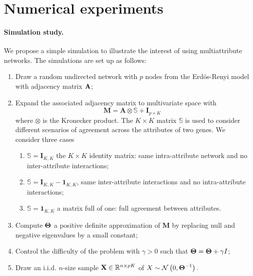 \section{Numerical  experiments}

\paragraph*{Simulation study.} We propose a simple simulation to
illustrate the interest of using multiattribute networks.  The
simulations are set up as follows:
\begin{enumerate}
\item  Draw  a random  undirected  network  with  $p$ nodes  from  the
  Erd\"os-Renyi model with adjacency matrix $\mathbf{A}$;
\item  Expand the  associated adjacency  matrix to  multivariate space
  with
  $$\mathbf{M} = \mathbf{A}  \otimes \mathbb{S} + \mathbf{I}_{p\times K}$$
  where $\otimes$ is the Kronecker product. The $K\times K$ matrix
  $\mathbb{S}$ is used to consider different scenarios of agreement
  across the attributes of two genes. We consider three cases
  \begin{enumerate}
  \item $\mathbb{S} = \mathbf{I}_{K,K}$ the $K\times K$ identity
    matrix: same intra-attribute network and no inter-attribute
    interactions;
  \item $\mathbb{S} = \mathbf{I}_{K,K} - \mathbf{1}_{K,K}$, same
    inter-attribute interactions and no intra-attribute interactions;
  \item $\mathbb{S} = \mathbf{1}_{K,K}$ a matrix full of one: full
    agreement between  attributes.
  \end{enumerate}
\item Compute $\boldsymbol\Theta$ a positive definite approximation of
  $\mathbf{M}$ by replacing null and negative eigenvalues by a small constant;
\item Control the difficulty of  the problem with $\gamma>0$ such that
  $\boldsymbol\Theta= \boldsymbol\Theta+ \gamma I$;
\item Draw an i.i.d. $n$-size sample $\mathbf{X}\in\mathbb{R}^{n\times pK}$ of
  $X \sim \mathcal{N} \left( 0,\boldsymbol\Theta^{-1} \right) .$
\end{enumerate}

